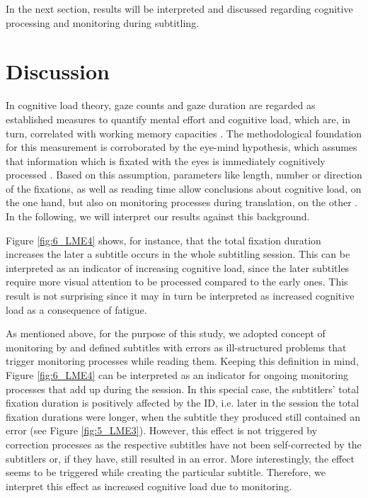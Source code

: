 \documentclass[output=paper]{langscibook}
\begin{document}
In the next section, results will be interpreted and discussed regarding cognitive processing and monitoring during subtitling.

\section{Discussion} 
In cognitive load theory, gaze counts and gaze duration are regarded as established measures to quantify mental effort and cognitive load, which are, in turn, correlated with working memory capacities \citep{buettner2013}.
The methodological foundation for this measurement is corroborated by the eye-mind hypothesis, which assumes that information which is fixated with the eyes is immediately cognitively processed \citep{just1980theory}.
Based on this assumption, parameters like length, number or direction of the fixations, as well as reading time allow conclusions about cognitive load, on the one hand, but also on monitoring processes during translation, on the other \citep{carl-dragsted2012, schaeffer-etal2019}.
In the following, we will interpret our results against this background.

Figure \ref{fig:6_LME4} shows, for instance, that the total fixation duration increases the later a subtitle occurs in the whole subtitling session.
This can be interpreted as an indicator of increasing cognitive load, since the later subtitles require more visual attention to be processed compared to the early ones.
This result is not surprising since it may in turn be interpreted as increased cognitive load as a consequence of fatigue.

As mentioned above, for the purpose of this study, we adopted concept of monitoring by \citet{kitchener1983cognition} and defined subtitles with errors as ill-structured problems that trigger monitoring processes while reading them.
Keeping this definition in mind, Figure \ref{fig:6_LME4} can be interpreted as an indicator for ongoing monitoring processes that add up during the session.
In this special case, the subtitlers' total fixation duration is positively affected by the ID, i.e. later in the session the total fixation durations were longer, when the subtitle they produced still contained an error (see Figure \ref{fig:5_LME3}).
However, this effect is not triggered by correction processes as the respective subtitles have not been self-corrected by the subtitlers or, if they have, still resulted in an error.
More interestingly, the effect seems to be triggered while creating the particular subtitle.
Therefore, we interpret this effect as increased cognitive load due to monitoring.
\end{document}
